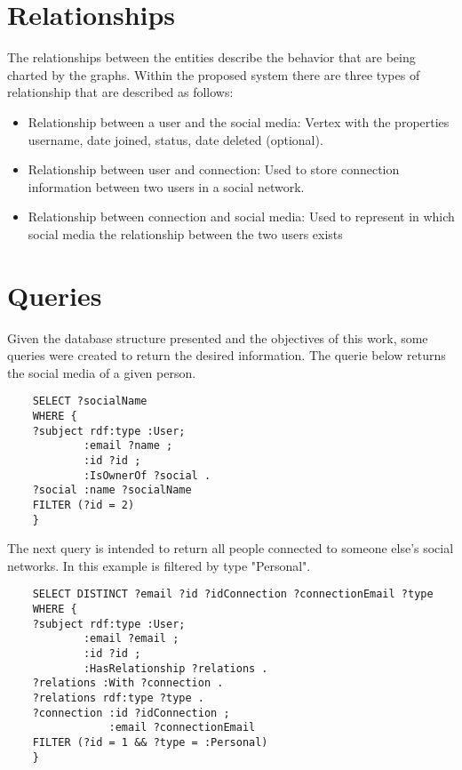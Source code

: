 \section{Relationships}

The relationships between the entities describe the behavior that are being charted by the graphs. Within the proposed system there are three types of relationship that are described as follows:

\begin{itemize}
    \item Relationship between a user and the social media: Vertex with the properties username, date joined, status, date deleted (optional).
    \item Relationship between user and connection: Used to store connection information between two users in a social network.
    \item Relationship between connection and social media: Used to represent in which social media the relationship between the two users exists
\end{itemize}


\section{Queries}

Given the database structure presented and the objectives of this work, some queries were created to return the desired information. 
The querie below returns the social media of a given person.
\begin{verbatim}
    SELECT ?socialName
    WHERE {
    ?subject rdf:type :User;
            :email ?name ;
            :id ?id ;
            :IsOwnerOf ?social .
    ?social :name ?socialName
    FILTER (?id = 2)
    }
\end{verbatim}


The next query is intended to return all people connected to someone else's social networks. In this example is filtered by type "Personal".

\begin{verbatim}
    SELECT DISTINCT ?email ?id ?idConnection ?connectionEmail ?type
    WHERE {
    ?subject rdf:type :User;
            :email ?email ;
            :id ?id ;
            :HasRelationship ?relations .
    ?relations :With ?connection .
    ?relations rdf:type ?type .
    ?connection :id ?idConnection ;
                :email ?connectionEmail
    FILTER (?id = 1 && ?type = :Personal)
    }
\end{verbatim}

